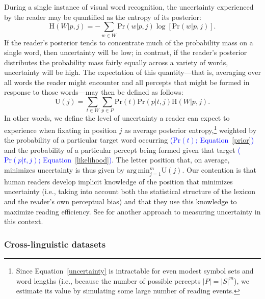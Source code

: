 \documentclass[doc,biblatex]{apa7}
\newcommand\newmaterial[1]{\textcolor{blue}{#1}}
\begin{document}
During a single instance of visual word recognition, the uncertainty experienced by the reader may be quantified as the entropy of its posterior:
\begin{equation}
\mathrm{H}(W|p,j) = -\sum_{w \in W} \mathrm{Pr}(w|p,j) \log [\mathrm{Pr}(w|p,j)].
\label{entropy}
\end{equation}
If the reader's posterior tends to concentrate much of the probability mass on a single word, then uncertainty will be low; in contrast, if the reader's posterior distributes the probability mass fairly equally across a variety of words, uncertainty will be high. The expectation of this quantity---that is, averaging over all words the reader might encounter and all percepts that might be formed in response to those words---may then be defined as follows:
\begin{equation}
\mathrm{U}(j) = \sum_{t \in W} \sum_{p \in P} \mathrm{Pr}(t) \mathrm{Pr}(p|t,j) \mathrm{H}(W|p,j).
\label{uncertainty}
\end{equation}
In other words, we define the level of uncertainty a reader can expect to experience when fixating in position $j$ as average posterior entropy,\footnote{Since Equation~\ref{uncertainty} is intractable for even modest symbol sets and word lengths (i.e., because the number of possible percepts $|P| = |S|^m$), we estimate its value by simulating some large number of reading events.} weighted by the probability of a particular target word occurring \newmaterial{($\mathrm{Pr}(t)$; Equation~\ref{prior})} and the probability of a particular percept being formed given that target \newmaterial{($\mathrm{Pr}(p|t,j)$; Equation~\ref{likelihood})}. The letter position that, on average, minimizes uncertainty is thus given by $\mathrm{arg\,min}_{j=1}^m \mathrm{U}(j)$. Our contention is that human readers develop implicit knowledge of the position that minimizes uncertainty (i.e., taking into account both the statistical structure of the lexicon and the reader's own perceptual bias) and that they use this knowledge to maximize reading efficiency. See \textcite{Alhama:2019} for another approach to measuring uncertainty in this context.

\subsubsection{Cross-linguistic datasets}
\end{document}
